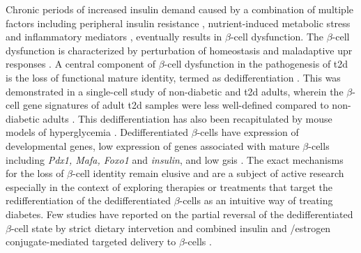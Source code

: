 \par Chronic periods of increased insulin demand caused by a combination of multiple factors including peripheral insulin resistance \textbf{\cite{petersen_mechanisms_2018}}, nutrient-induced metabolic stress \textbf{\cite{prentki_nutrient-induced_2020,cnop_endoplasmic_2017}} and inflammatory mediators \textbf{\cite{eizirik_pancreatic_2020,cosentino_crosstalk_2021}}, eventually results in $\beta$-cell dysfunction. The $\beta$-cell dysfunction is characterized by perturbation of  homeostasis and maladaptive \gls{upr} responses \textbf{\cite{kalwat_pancreatic_2021}}. A central component of $\beta$-cell dysfunction in the pathogenesis of \gls{t2d} is the loss of functional mature identity, termed as dedifferentiation \textbf{\cite{miranda_pancreatic_2021}}. This was demonstrated in a single-cell study of non-diabetic and \gls{t2d} adults, wherein the $\beta$-cell gene signatures of adult \gls{t2d} samples were less well-defined compared to non-diabetic adults \textbf{\cite{wang_single-cell_2016}}. This dedifferentiation has also been recapitulated by mouse models of hyperglycemia \textbf{\cite{sachs_targeted_2020,oppenlander_vertical_2021}}. Dedifferentiated $\beta$-cells have expression of developmental genes, low expression of genes associated with mature $\beta$-cells including \textit{Pdx1, Mafa, Foxo1} and \textit{insulin}, and low \gls{gsis} \textbf{\cite{miranda_pancreatic_2021}}. The exact mechanisms for the loss of $\beta$-cell identity remain elusive and are a subject of active research especially in the context of exploring therapies or treatments that target the redifferentiation of the dedifferentiated $\beta$-cells as an intuitive way of treating diabetes. Few studies have reported on the partial reversal of the dedifferentiated $\beta$-cell state by strict dietary intervetion \textbf{\cite{sheng_reversibility_2016,ishida_pair_2017}} and combined insulin and /estrogen conjugate-mediated targeted delivery to $\beta$-cells \textbf{\cite{sachs_targeted_2020,oppenlander_vertical_2021}}.\\

